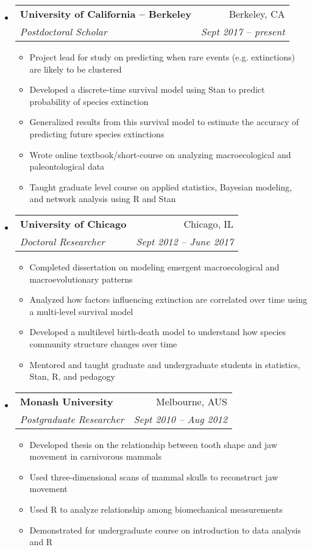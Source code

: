 \documentclass[letterpaper,11pt]{article}
\makeatletter
\newcommand{\resitem}[1]{\item #1 \vspace{-2pt}}
\newcommand{\ressubheading}[4]{
  \begin{tabular*}{6.5in}{l@{\extracolsep{\fill}}r}
    \textbf{#1} & #2 \\
    \textit{#3} & \textit{#4} \\
\end{tabular*}\vspace{-6pt}}
\makeatother
\begin{document}
\begin{itemize}
  \item 
    \ressubheading{University of California -- Berkeley}{Berkeley, CA}{Postdoctoral Scholar}{Sept 2017 -- present}
    { \footnotesize
      \begin{itemize}
          \resitem{Project lead for study on predicting when rare events (e.g. extinctions) are likely to be clustered }
          \resitem{Developed a discrete-time survival model using Stan to predict probability of species extinction }
          \resitem{Generalized results from this survival model to estimate the accuracy of predicting future species extinctions }
          \resitem{Wrote online textbook/short-course on analyzing macroecological and paleontological data }
          \resitem{Taught graduate level course on applied statistics, Bayesian modeling, and network analysis using R and Stan }
      \end{itemize}
    }
  \item 
    \ressubheading{University of Chicago}{Chicago, IL}{Doctoral Researcher}{Sept 2012 -- June 2017}
    { \footnotesize
      \begin{itemize}
          \resitem{Completed dissertation on modeling emergent macroecological and macroevolutionary patterns }
          \resitem{Analyzed how factors influencing extinction are correlated over time using a multi-level survival model }
          \resitem{Developed a multilevel birth-death model to understand how species community structure changes over time }
          \resitem{Mentored and taught graduate and undergraduate students in statistics, Stan, R, and pedagogy }
      \end{itemize}
    }
		\item 
			\ressubheading{Monash University}{Melbourne, AUS}{Postgraduate Researcher}{Sept 2010 -- Aug 2012}
				{ \footnotesize
				\begin{itemize}
            \resitem{Developed thesis on the relationship between tooth shape and jaw movement in carnivorous mammals }
            \resitem{Used three-dimensional scans of mammal skulls to reconstruct jaw movement }
            \resitem{Used R to analyze relationship among biomechanical measurements }
            \resitem{Demonstrated for undergraduate course on introduction to data analysis and R }

\end{itemize}}
\end{itemize}
\end{document}
